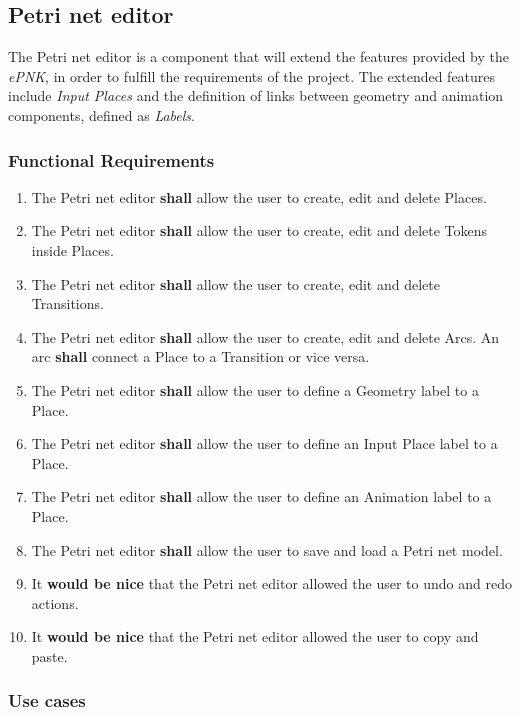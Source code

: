 \subsection{Petri net editor}
\label{sec:sf-petrinet}

The Petri net editor is a component that will extend the features provided by the \textit{ePNK}, in order to fulfill the requirements of the project. The extended features include \textit{Input Places} and the definition of links between geometry and animation components, defined as \textit{Labels}.

\subsubsection{Functional Requirements}

\begin{enumerate}
	\item The Petri net editor \textbf{shall} allow the user to create, edit and delete Places.
	\item The Petri net editor \textbf{shall} allow the user to create, edit and delete Tokens inside Places.
	\item The Petri net editor \textbf{shall} allow the user to create, edit and delete Transitions.
	\item The Petri net editor \textbf{shall} allow the user to create, edit and delete Arcs. An arc \textbf{shall} connect a Place to a Transition or vice versa.
	\item The Petri net editor \textbf{shall} allow the user to define a Geometry label to a Place.
	\item The Petri net editor \textbf{shall} allow the user to define an Input Place label to a Place.
	\item The Petri net editor \textbf{shall} allow the user to define an Animation label to a Place.
	\item The Petri net editor \textbf{shall} allow the user to save and load a Petri net model.
	\item It \textbf{would be nice} that the Petri net editor allowed the user to undo and redo actions.
	\item It \textbf{would be nice} that the Petri net editor allowed the user to copy and paste.
\end{enumerate}

\subsubsection{Use cases}

